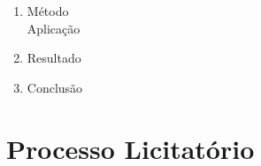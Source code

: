 \documentclass{beamer}
\begin{document}
\begin{frame}
\begin{enumerate}
			\item Método\\
			\textcolor{ExecusharesGrey}{\footnotesize\hspace{1em} Aplicação}\\			 
			\item Resultado\\ 
			\item Conclusão\\
		\end{enumerate}
	\end{frame}

	\setcounter{framenumber}{0}
	\setcounter{showProgressBar}{2}
	\setcounter{showSlideNumbers}{2}
	
	\section{Processo Licitatório}
	
\end{document}
